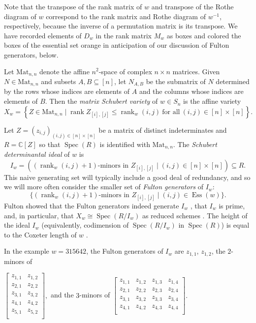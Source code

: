 \documentclass[ALCO,Unicode,published]{cedram}
\DeclareMathOperator{\Ess}{Ess}
\DeclareMathOperator{\rank}{rank}
\DeclareMathOperator{\Spec}{Spec}
\begin{document}
Note that the transpose of the rank matrix of $w$ and transpose of the Rothe diagram of $w$ correspond to the rank matrix and Rothe diagram of $w^{-1}$, respectively, because the inverse of a permutation matrix is its transpose.  We have recorded elements of $D_w$ in the rank matrix $M_w$ as boxes and colored the boxes of the essential set orange in anticipation of our discussion of Fulton generators, below.

Let $\mbox{Mat}_{n,n}$ denote the affine $n^2$-space of complex $n \times n$ matrices.  Given $N \in \mbox{Mat}_{n,n}$ and subsets $A,B \subseteq [n]$, let $N_{A,B}$ be the submatrix of $N$ determined by the rows whose indices are elements of $A$ and the columns whose indices are elements of $B$.  Then the \emph{matrix Schubert variety} of $w \in S_n$ is the affine variety \[
X_w = \left\{Z \in \mbox{Mat}_{n,n}\mid \rank{Z_{[i],[j]}} \leq \rank_w(i,j)\ \mbox{for all}\ (i,j) \in [n] \times [n] \right\}.
\]

Let $Z = (z_{i,j})_{(i,j) \in [n] \times [n]}$ be a matrix of distinct indeterminates and $R = \mathbb{C}[Z]$ so that $\Spec(R)$ is identified with $\mbox{Mat}_{n,n}$.  The \emph{Schubert determinantal ideal} of $w$ is 
\[
I_w = ( (\rank_w(i,j)+1)\text{-minors in } Z_{[i],[j]} \mid (i,j) \in [n] \times [n] ) \subseteq R.
\]  This naive generating set will typically include a good deal of redundancy, and so we will more often consider the smaller set of \emph{Fulton generators} of $I_w$: \[
	\{(\rank_w(i,j)+1)\text{-minors in } Z_{[i],[j]} \mid (i,j) \in \Ess(w) \}.
\]  Fulton showed that the Fulton generators indeed generate $I_w$ \cite[Lemma 3.10]{Ful92}, that $I_w$ is prime, and, in particular, that $X_w \cong \Spec(R/I_w)$ as reduced schemes  \cite[Proposition 3.3]{Ful92}.  The height of the ideal $I_w$ (equivalently, codimension of $\Spec(R/I_w)$ in $\Spec(R)$) is equal to the Coxeter length of $w$ \cite[Proposition 3.3]{Ful92}.

In the example $w = 315642$, the Fulton generators of $I_w$ are $z_{1,1}$, $z_{1,2}$, the $2$-minors of \begin{center} $\begin{bmatrix}
z_{1,1} & z_{1,2}\\
z_{2,1} & z_{2,2}\\
z_{3,1} & z_{3,2}\\
z_{4,1} & z_{4,2}\\
z_{5,1} & z_{5,2}\\
\end{bmatrix},
$ and the $3$-minors of  $\begin{bmatrix}
z_{1,1} & z_{1,2} & z_{1,3} & z_{1,4}\\
z_{2,1} & z_{2,2} & z_{2,3} & z_{2,4}\\
z_{3,1} & z_{3,2} & z_{3,3} & z_{3,4}\\
z_{4,1} & z_{4,2} & z_{4,3} & z_{4,4}\\
\end{bmatrix}.
$ \end{center} 
\end{document}
